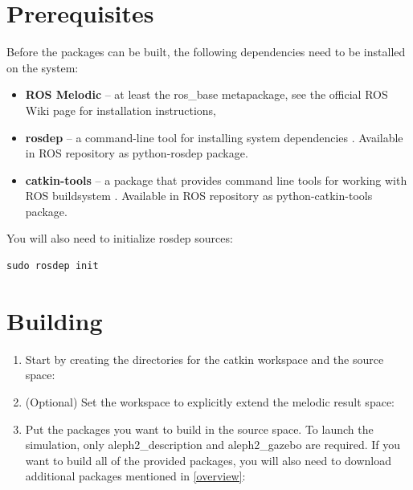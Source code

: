 \documentclass[english,inz,shortabstract]{iithesis}
\newcommand{\val}[1]{\textbf{\textsf{#1}}}
\begin{document}
{ %
\setlength{\parindent}{0pt}

\section{Prerequisites}
Before the packages can be built, the following dependencies need to be installed on the system:

\begin{itemize}
	\item \val{ROS Melodic} -- at least the \textsf{ros\_base} metapackage, see the official ROS Wiki page \cite{usage:ros_installation} for installation instructions,
	\item \val{rosdep} -- a command-line tool for installing system dependencies \cite{usage:rosdep}. Available in ROS repository as \textsf{python-rosdep} package.
	\item \val{catkin-tools} -- a package that provides command line tools for working with ROS buildsystem \cite{usage:catkin}. Available in ROS repository as \textsf{python-catkin-tools} package.
\end{itemize}

You will also need to initialize \textsf{rosdep} sources:
\begin{lstlisting}[language=mybash]
sudo rosdep init
\end{lstlisting}


\section{Building}

\begin{enumerate}

\item Start by creating the directories for the catkin workspace and the source space:


\item (Optional) Set the workspace to explicitly extend the \textsf{melodic} result space:


\item Put the packages you want to build in the source space. To launch the simulation, only \textsf{aleph2\_description} and \textsf{aleph2\_gazebo} are required. If you want to build all of the provided packages, you will also need to download additional packages mentioned in \ref{overview}:



\end{enumerate}}
\end{document}
